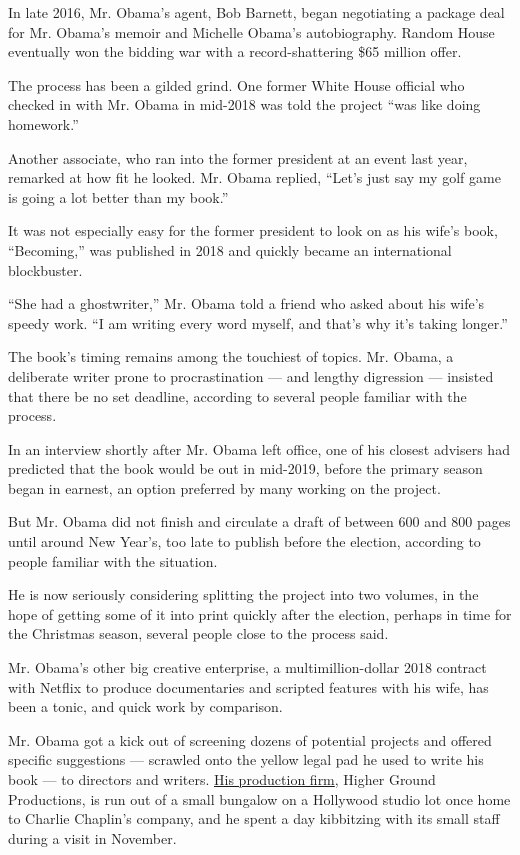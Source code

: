In late 2016, Mr. Obama's agent, Bob Barnett, began negotiating a
package deal for Mr. Obama's memoir and Michelle Obama's autobiography.
Random House eventually won the bidding war with a record-shattering
\$65 million offer.

The process has been a gilded grind. One former White House official who
checked in with Mr. Obama in mid-2018 was told the project ``was like
doing homework.''

Another associate, who ran into the former president at an event last
year, remarked at how fit he looked. Mr. Obama replied, ``Let's just say
my golf game is going a lot better than my book.''

It was not especially easy for the former president to look on as his
wife's book, ``Becoming,'' was published in 2018 and quickly became an
international blockbuster.

``She had a ghostwriter,'' Mr. Obama told a friend who asked about his
wife's speedy work. ``I am writing every word myself, and that's why
it's taking longer.''

The book's timing remains among the touchiest of topics. Mr. Obama, a
deliberate writer prone to procrastination --- and lengthy digression
--- insisted that there be no set deadline, according to several people
familiar with the process.

In an interview shortly after Mr. Obama left office, one of his closest
advisers had predicted that the book would be out in mid-2019, before
the primary season began in earnest, an option preferred by many working
on the project.

But Mr. Obama did not finish and circulate a draft of between 600 and
800 pages until around New Year's, too late to publish before the
election, according to people familiar with the situation.

He is now seriously considering splitting the project into two volumes,
in the hope of getting some of it into print quickly after the election,
perhaps in time for the Christmas season, several people close to the
process said.

Mr. Obama's other big creative enterprise, a multimillion-dollar 2018
contract with Netflix to produce documentaries and scripted features
with his wife, has been a tonic, and quick work by comparison.

Mr. Obama got a kick out of screening dozens of potential projects and
offered specific suggestions --- scrawled onto the yellow legal pad he
used to write his book --- to directors and writers.
\href{https://www.nytimes.com/2019/04/30/business/media/obama-netflix-shows.html}{His
production firm}, Higher Ground Productions, is run out of a small
bungalow on a Hollywood studio lot once home to Charlie Chaplin's
company, and he spent a day kibbitzing with its small staff during a
visit in November.

